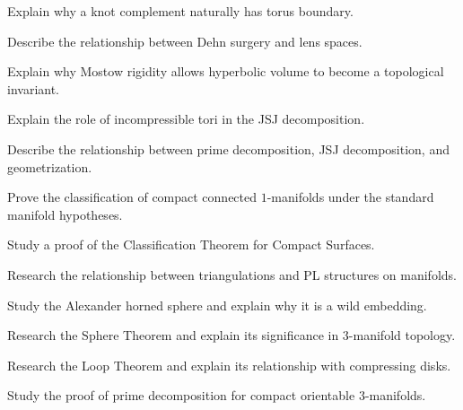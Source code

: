 \begin{exercise}[3]
Explain why a knot complement naturally has torus boundary.
\end{exercise}

\begin{exercise}[3]
Describe the relationship between Dehn surgery and lens spaces.
\end{exercise}

\begin{exercise}[3]
Explain why Mostow rigidity allows hyperbolic volume to become a topological
invariant.
\end{exercise}

\begin{exercise}[3]
Explain the role of incompressible tori in the JSJ decomposition.
\end{exercise}

\begin{exercise}[3]
Describe the relationship between prime decomposition, JSJ decomposition,
and geometrization.
\end{exercise}

\begin{exercise}[4]
Prove the classification of compact connected \(1\)-manifolds under the
standard manifold hypotheses.
\end{exercise}

\begin{exercise}[4]
Study a proof of the Classification Theorem for Compact Surfaces.
\end{exercise}

\begin{exercise}[4]
Research the relationship between triangulations and PL structures on
manifolds.
\end{exercise}

\begin{exercise}[4]
Study the Alexander horned sphere and explain why it is a wild embedding.
\end{exercise}

\begin{exercise}[4]
Research the Sphere Theorem and explain its significance in
\(3\)-manifold topology.
\end{exercise}

\begin{exercise}[4]
Research the Loop Theorem and explain its relationship with compressing
disks.
\end{exercise}

\begin{exercise}[4]
Study the proof of prime decomposition for compact orientable
\(3\)-manifolds.
\end{exercise}


